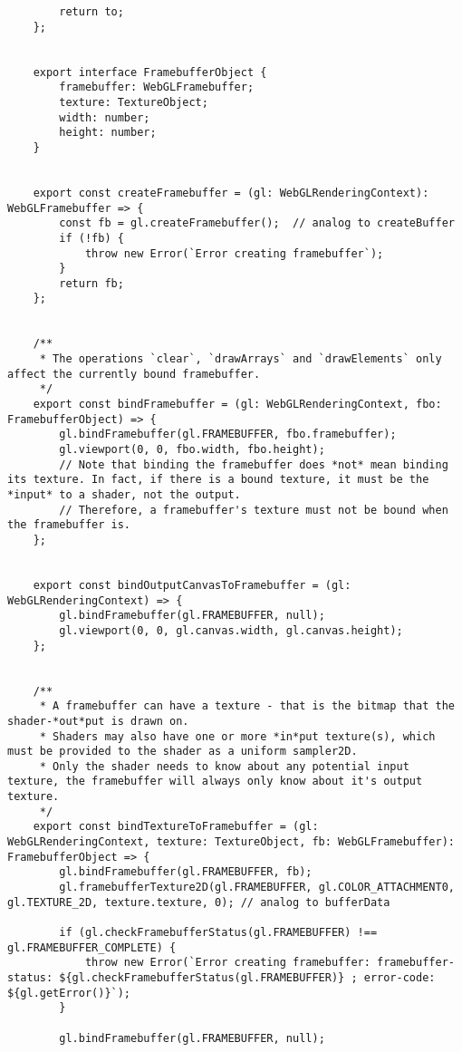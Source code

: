 \begin{lstlisting}
        return to;
    };
    
    
    export interface FramebufferObject {
        framebuffer: WebGLFramebuffer;
        texture: TextureObject;
        width: number;
        height: number;
    }
    
    
    export const createFramebuffer = (gl: WebGLRenderingContext): WebGLFramebuffer => {
        const fb = gl.createFramebuffer();  // analog to createBuffer
        if (!fb) {
            throw new Error(`Error creating framebuffer`);
        }
        return fb;
    };
    
    
    /**
     * The operations `clear`, `drawArrays` and `drawElements` only affect the currently bound framebuffer.
     */
    export const bindFramebuffer = (gl: WebGLRenderingContext, fbo: FramebufferObject) => {
        gl.bindFramebuffer(gl.FRAMEBUFFER, fbo.framebuffer);
        gl.viewport(0, 0, fbo.width, fbo.height);
        // Note that binding the framebuffer does *not* mean binding its texture. In fact, if there is a bound texture, it must be the *input* to a shader, not the output.
        // Therefore, a framebuffer's texture must not be bound when the framebuffer is.
    };
    
    
    export const bindOutputCanvasToFramebuffer = (gl: WebGLRenderingContext) => {
        gl.bindFramebuffer(gl.FRAMEBUFFER, null);
        gl.viewport(0, 0, gl.canvas.width, gl.canvas.height);
    };
    
    
    /**
     * A framebuffer can have a texture - that is the bitmap that the shader-*out*put is drawn on.
     * Shaders may also have one or more *in*put texture(s), which must be provided to the shader as a uniform sampler2D.
     * Only the shader needs to know about any potential input texture, the framebuffer will always only know about it's output texture.
     */
    export const bindTextureToFramebuffer = (gl: WebGLRenderingContext, texture: TextureObject, fb: WebGLFramebuffer): FramebufferObject => {
        gl.bindFramebuffer(gl.FRAMEBUFFER, fb);
        gl.framebufferTexture2D(gl.FRAMEBUFFER, gl.COLOR_ATTACHMENT0, gl.TEXTURE_2D, texture.texture, 0); // analog to bufferData
    
        if (gl.checkFramebufferStatus(gl.FRAMEBUFFER) !== gl.FRAMEBUFFER_COMPLETE) {
            throw new Error(`Error creating framebuffer: framebuffer-status: ${gl.checkFramebufferStatus(gl.FRAMEBUFFER)} ; error-code: ${gl.getError()}`);
        }
    
        gl.bindFramebuffer(gl.FRAMEBUFFER, null);
    

\end{lstlisting}
